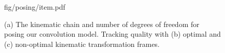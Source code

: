 \begin{figure}[t!]
\centering
\begin{overpic} 
[width=\linewidth]
{fig/posing/item.pdf}
\end{overpic}
\caption{
% 
% 
(a) The kinematic chain and number of degrees of freedom for posing our convolution model.
Tracking quality with 
(b) optimal and 
(c) non-optimal kinematic transformation frames. 
% 
% 
}
\label{fig:posing}
\end{figure}